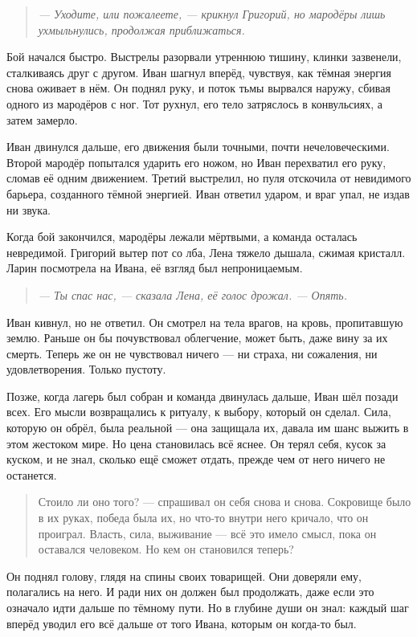 \documentclass[12pt,a4paper]{book} %
\newenvironment{dialogue}{\begin{quote}\itshape}{\end{quote}}
\begin{document}
\begin{dialogue}
--- Уходите, или пожалеете, --- крикнул Григорий, но мародёры лишь ухмыльнулись, продолжая приближаться.
\end{dialogue}

Бой начался быстро. Выстрелы разорвали утреннюю тишину, клинки зазвенели, сталкиваясь друг с другом. Иван шагнул вперёд, чувствуя, как тёмная энергия снова оживает в нём. Он поднял руку, и поток тьмы вырвался наружу, сбивая одного из мародёров с ног. Тот рухнул, его тело затряслось в конвульсиях, а затем замерло.

Иван двинулся дальше, его движения были точными, почти нечеловеческими. Второй мародёр попытался ударить его ножом, но Иван перехватил его руку, сломав её одним движением. Третий выстрелил, но пуля отскочила от невидимого барьера, созданного тёмной энергией. Иван ответил ударом, и враг упал, не издав ни звука.

Когда бой закончился, мародёры лежали мёртвыми, а команда осталась невредимой. Григорий вытер пот со лба, Лена тяжело дышала, сжимая кристалл. Ларин посмотрела на Ивана, её взгляд был непроницаемым.

\begin{dialogue}
--- Ты спас нас, --- сказала Лена, её голос дрожал. --- Опять.
\end{dialogue}

Иван кивнул, но не ответил. Он смотрел на тела врагов, на кровь, пропитавшую землю. Раньше он бы почувствовал облегчение, может быть, даже вину за их смерть. Теперь же он не чувствовал ничего --- ни страха, ни сожаления, ни удовлетворения. Только пустоту.

Позже, когда лагерь был собран и команда двинулась дальше, Иван шёл позади всех. Его мысли возвращались к ритуалу, к выбору, который он сделал. Сила, которую он обрёл, была реальной --- она защищала их, давала им шанс выжить в этом жестоком мире. Но цена становилась всё яснее. Он терял себя, кусок за куском, и не знал, сколько ещё сможет отдать, прежде чем от него ничего не останется.

\begin{quote}
Стоило ли оно того? --- спрашивал он себя снова и снова. Сокровище было в их руках, победа была их, но что-то внутри него кричало, что он проиграл. Власть, сила, выживание --- всё это имело смысл, пока он оставался человеком. Но кем он становился теперь?
\end{quote}

Он поднял голову, глядя на спины своих товарищей. Они доверяли ему, полагались на него. И ради них он должен был продолжать, даже если это означало идти дальше по тёмному пути. Но в глубине души он знал: каждый шаг вперёд уводил его всё дальше от того Ивана, которым он когда-то был.
\end{document}
